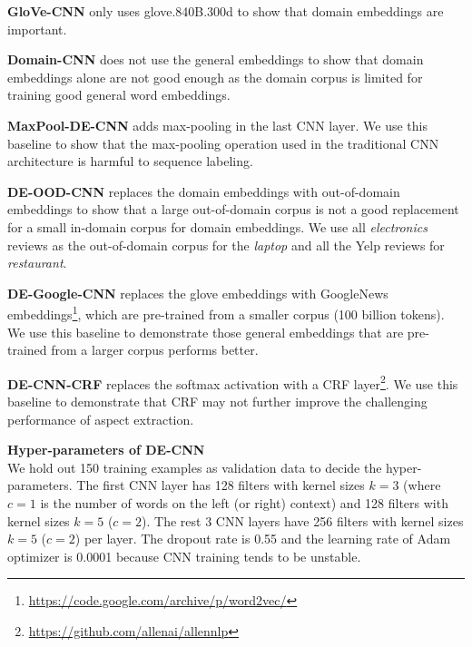 \textbf{GloVe-CNN} only uses glove.840B.300d to show that domain embeddings are important. 

\textbf{Domain-CNN} does not use the general embeddings to show that domain embeddings alone are not good enough as the domain corpus is limited for training good general word embeddings.

\textbf{MaxPool-DE-CNN} adds max-pooling in the last CNN layer. We use this baseline to show that the max-pooling operation used in the traditional CNN architecture is harmful to sequence labeling.

\textbf{DE-OOD-CNN} replaces the domain embeddings with out-of-domain embeddings to show that a large out-of-domain corpus is not a good replacement for a small in-domain corpus for domain embeddings.
We use all \textit{electronics} reviews as the out-of-domain corpus for the \textit{laptop} and all the Yelp reviews for \textit{restaurant}.

\textbf{DE-Google-CNN} replaces the glove embeddings with GoogleNews embeddings\footnote{\url{https://code.google.com/archive/p/word2vec/} }, which are pre-trained from a smaller corpus (100 billion tokens). We use this baseline to demonstrate those general embeddings that are pre-trained from a larger corpus performs better.

\textbf{DE-CNN-CRF} replaces the softmax activation with a CRF layer\footnote{\url{https://github.com/allenai/allennlp}}. We use this baseline to demonstrate that CRF may not further improve the challenging performance of aspect extraction.

\textbf{Hyper-parameters of DE-CNN}\\
We hold out 150 training examples as validation data to decide the hyper-parameters.
The first CNN layer has 128 filters with kernel sizes $k=3$ (where $c=1$ is the number of words on the left (or right) context) and 128 filters with kernel sizes $k=5$ ($c=2$).
The rest 3 CNN layers have 256 filters with kernel sizes $k=5$ ($c=2$) per layer.
The dropout rate is 0.55 and the learning rate of Adam optimizer \cite{kingma2014adam} is 0.0001 because CNN training tends to be unstable.

